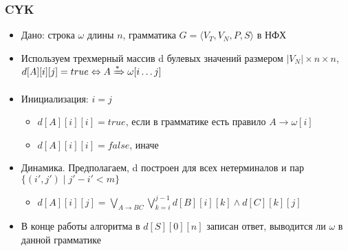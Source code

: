 \documentclass{beamer}
\newcommand{\derives}[1][*]{\xRightarrow[]{#1}}
\begin{document}
\begin{frame}[fragile]
  \transwipe[direction=90]
  \frametitle{CYK}
  \begin{itemize}
      \item Дано: строка $\omega$ длины $n$, грамматика $G = \langle V_T, V_N, P, S\rangle$ в НФХ
      \item Используем трехмерный массив d булевых значений размером $|V_N| \times n \times n$, $d[A][i][j] = true \Leftrightarrow A \derives \omega[i \dots j]$
      \item Инициализация: $i = j$
      \begin{itemize}
        \item $d[A][i][i] = true$, если в грамматике есть правило $A \to \omega[i]$
        \item $d[A][i][i] = false$, иначе
      \end{itemize}
      \item Динамика. Предполагаем, d построен для всех нетерминалов и пар $\{(i', j') \mid j' - i' < m \}$
      \begin{itemize}
        \item $d[A][i][j] = \bigvee_{A\to BC}^{}{\bigvee_{k=i}^{j-1}{d[B][i][k] \wedge d[C][k][j]}}$
      \end{itemize}
      \item В конце работы алгоритма в $d[S][0][n]$ записан ответ, выводится ли $\omega$ в данной грамматике
  \end{itemize}
\end{frame}

 
\end{document}
